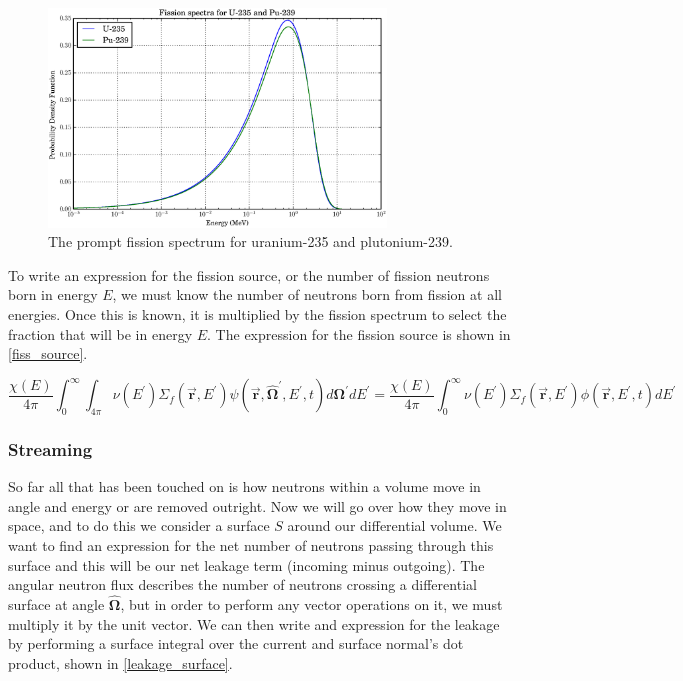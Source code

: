 \begin{figure}[h!] 
  \label{fiss_spec}
  \centering
    \includegraphics[width=0.8\textwidth ]{graphics/fiss_spec.eps} 
     \caption{The prompt fission spectrum for uranium-235 and plutonium-239.}
\end{figure}

To write an expression for the fission source, or the number of fission neutrons born in energy $E$, we must know the number of neutrons born from fission at all energies.  Once this is known, it is multiplied by the fission spectrum to select the fraction that will be in energy $E$.  The expression for the fission source is shown in \eqref{fiss_source}.

\begin{equation}
\label{fiss_source}
\frac{\chi(E)}{4\pi} \int_0^\infty  \int_{4\pi}   \nu(E^\prime) \Sigma_f(\boldsymbol{\vec{r}},E^\prime) \psi(\boldsymbol{\vec{r}},\boldsymbol{\hat{\Omega}}^\prime,E^\prime,t) d\boldsymbol{\Omega}^\prime  dE^\prime = \frac{\chi(E)}{4\pi} \int_0^\infty   \nu(E^\prime) \Sigma_f(\boldsymbol{\vec{r}},E^\prime) \phi(\boldsymbol{\vec{r}},E^\prime,t)  dE^\prime
 \end{equation}


\subsubsection{Streaming}

So far all that has been  touched on is how neutrons within a volume move in angle and energy or are removed outright.  Now we will go over how they move in space, and to do this we consider a surface $S$ around our differential volume.  We want to find an expression for the net number of neutrons passing through this surface and this will be our net leakage term (incoming minus outgoing).  The angular neutron flux describes the number of neutrons crossing a differential surface at angle $\boldsymbol{\hat{\Omega}}$, but in order to perform any vector operations on it, we must multiply it by the unit vector.  We can then write and expression for the leakage by performing a surface integral over the current and surface normal's dot product, shown in \eqref{leakage_surface}.

